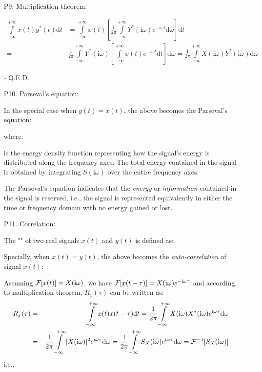 \begin{itemize}
	\item[P9.] Multiplication theorem:
	
	
	\begin{dem} 
	\begin{eqnarray}
	 \int\limits_{-\infty}^{+\infty} x(t)y^*(t) \mathrm{d}t
	&=\int\limits_{-\infty}^{+\infty} x(t) \left[\frac{1}{2\pi}\int\limits_{-\infty}^{+\infty} Y^*(\mathrm{i}\omega)e^{-\mathrm{i}\omega t}\mathrm{d}\omega\right]\mathrm{d}t
		\nonumber \\
	=& \frac{1}{2\pi}\int\limits_{-\infty}^{+\infty} Y^*(\mathrm{i}\omega)\left[\int\limits_{-\infty}^{+\infty} 
		x(t)e^{-\mathrm{i}\omega t} \mathrm{d}t\right] \mathrm{d}\omega
		=\frac{1}{2\pi}\int\limits_{-\infty}^{+\infty} X(\mathrm{i}\omega)Y^*(\mathrm{i}\omega) \mathrm{d}\omega
		\nonumber
	\end{eqnarray}
	\begin{flushright}
		$\square$  Q.E.D.
	\end{flushright}
	\end{dem}
	
	\item[P10.] Parseval's equation:
	
	In the special case when $y(t)=x(t)$, the above becomes the Parseval's equation:
	
	where:
	
	is the energy density function representing how the signal's energy is
	distributed along the frequency axes. The total energy contained in the 
	signal is obtained by integrating $S(\mathrm{i}\omega)$ over the entire frequency axes.
	
	The Parseval's equation indicates that the {\em energy} or {\em information}
	contained in the signal is reserved, i.e., the signal is represented 
	equivalently in either the time or frequency domain with no energy gained
	or lost.
	
	\item[P11.] Correlation:
	
	The "" of two real signals $x(t)$ and $y(t)$ is defined as:
	
	Specially, when $x(t)=y(t)$, the above becomes the {\em auto-correlation} of signal $x(t)$:
	
	Assuming ${\cal F}[x(t)]=X(\mathrm{i}\omega)$, we have ${\cal F}[x(t-\tau)]=X(\mathrm{i}\omega)e^{-\mathrm{i}\omega\tau}$
	and according to multiplication theorem, $R_x(\tau)$ can be written as:
	\begin{eqnarray}
	R_x(\tau)&=&\int\limits_{-\infty}^{+\infty}	x(t)x(t-\tau)\mathrm{d}t	
		=\frac{1}{2\pi}\int\limits_{-\infty}^{+\infty}	X(\mathrm{i}\omega)X^*(\mathrm{i}\omega)e^{\mathrm{i}\omega\tau}\mathrm{d}\omega
		\nonumber \\
		&=&\frac{1}{2\pi}\int\limits_{-\infty}^{+\infty} |X(\mathrm{i}\omega)|^2e^{\mathrm{i}\omega\tau}\mathrm{d}\omega
		=\frac{1}{2\pi}\int\limits_{-\infty}^{+\infty}	S_X(\mathrm{i}\omega) e^{\mathrm{i}\omega\tau}\mathrm{d}\omega
		= {\cal F}^{-1}[S_X(\mathrm{i}\omega)]
		\nonumber 
	\end{eqnarray}
	i.e.,
	

\end{itemize}
